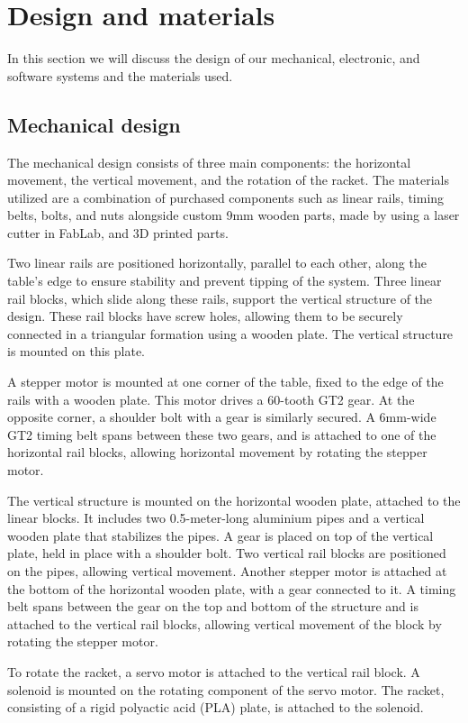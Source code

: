 \chapter{Design and materials}
In this section we will discuss the design of our mechanical, electronic, and software systems and the materials used.

\section{Mechanical design}
The mechanical design consists of three main components: the horizontal movement,  the vertical movement,  and the rotation of the racket. 
The materials utilized are a combination of purchased components such as linear rails, timing belts, bolts, and nuts alongside custom 9mm wooden parts, made by using a laser cutter in FabLab, and 3D printed parts.

Two linear rails are positioned horizontally, parallel to each other, along the table's edge to ensure stability and prevent tipping of the system. Three linear rail blocks, which slide along these rails, support the vertical structure of the design. These rail blocks have screw holes, allowing them to be securely connected in a triangular formation using a wooden plate. The vertical structure is mounted on this plate.

A stepper motor is mounted at one corner of the table, fixed to the edge of the rails with a wooden plate. This motor drives a 60-tooth GT2 gear. At the opposite corner, a shoulder bolt with a gear is similarly secured. A 6mm-wide GT2 timing belt spans between these two gears, and is attached to one of the horizontal rail blocks, allowing horizontal movement by rotating the stepper motor.

The vertical structure is mounted on the horizontal wooden plate, attached to the linear blocks. It includes two 0.5-meter-long aluminium pipes and a vertical wooden plate that stabilizes the pipes. A gear is placed on top of the vertical plate, held in place with a shoulder bolt. Two vertical rail blocks are positioned on the pipes, allowing vertical movement. Another stepper motor is attached at the bottom of the horizontal wooden plate, with a gear connected to it. A timing belt spans between the gear on the top and bottom of the structure and is attached to the vertical rail blocks, allowing vertical movement of the block by rotating the stepper motor.

To rotate the racket, a servo motor is attached to the vertical rail block. A solenoid is mounted on the rotating component of the servo motor. The racket, consisting of a rigid polyactic acid (PLA) plate, is attached to the solenoid.

